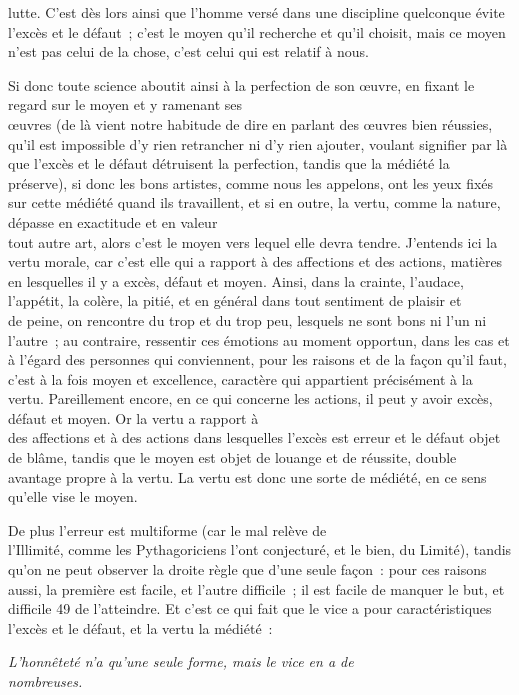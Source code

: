 \documentclass[french,twoside]{book} %
\begin{document}
lutte. C’est dès lors ainsi que l’homme versé dans une discipline quelconque évite l’excès et le défaut ; c’est le moyen qu’il recherche et qu’il choisit, mais ce moyen n’est pas celui de la chose, c’est celui qui est relatif à nous.\par
Si donc toute science aboutit ainsi à la perfection de son œuvre, en fixant le regard sur le moyen et y ramenant ses \\
œuvres (de là vient notre habitude de dire en parlant des œuvres bien réussies, qu’il est impossible d’y rien retrancher ni d’y rien ajouter, voulant signifier par là que l’excès et le défaut détruisent la perfection, tandis que la médiété la préserve), si donc les bons artistes, comme nous les appelons, ont les yeux fixés sur cette médiété quand ils travaillent, et si en outre, la vertu, comme la nature, dépasse en exactitude et en valeur \\
tout autre art, alors c’est le moyen vers lequel elle devra tendre. J’entends ici la vertu morale, car c’est elle qui a rapport à des affections et des actions, matières en lesquelles il y a excès, défaut et moyen. Ainsi, dans la crainte, l’audace, l’appétit, la colère, la pitié, et en général dans tout sentiment de plaisir et \\
de peine, on rencontre du trop et du trop peu, lesquels ne sont bons ni l’un ni l’autre ; au contraire, ressentir ces émotions au moment opportun, dans les cas et à l’égard des personnes qui conviennent, pour les raisons et de la façon qu’il faut, c’est à la fois moyen et excellence, caractère qui appartient précisément à la vertu. Pareillement encore, en ce qui concerne les actions, il peut y avoir excès, défaut et moyen. Or la vertu a rapport à \\
des affections et à des actions dans lesquelles l’excès est erreur et le défaut objet de blâme, tandis que le moyen est objet de louange et de réussite, double avantage propre à la vertu. La vertu est donc une sorte de médiété, en ce sens qu’elle vise le moyen.\par
De plus l’erreur est multiforme (car le mal relève de \\
l’Illimité, comme les Pythagoriciens l’ont conjecturé, et le bien, du Limité), tandis qu’on ne peut observer la droite règle que d’une seule façon : pour ces raisons aussi, la première est facile, et l’autre difficile ; il est facile de manquer le but, et difficile 49 de l’atteindre. Et c’est ce qui fait que le vice a pour caractéristiques l’excès et le défaut, et la vertu la médiété :\par
 {\itshape L’honnêteté n’a qu’une seule forme, mais le vice en a de} \\
 {\itshape nombreuses.} 
\end{document}
